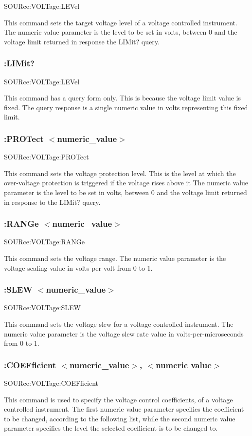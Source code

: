 {\ttfamily S\-O\-U\-Rce\-:\-V\-O\-L\-Tage\-:L\-E\-Vel}\par
 This command sets the target voltage level of a voltage controlled instrument. The numeric value parameter is the level to be set in volts, between 0 and the voltage limit returned in response the L\-I\-Mit? query.\hypertarget{a00002_sourvoltlim}{}\subsubsection{\-:\-L\-I\-Mit?}\label{a00002_sourvoltlim}
{\ttfamily S\-O\-U\-Rce\-:\-V\-O\-L\-Tage\-:L\-E\-Vel}\par
 This command has a query form only. This is because the voltage limit value is fixed. The query response is a single numeric value in volts representing this fixed limit.\hypertarget{a00002_sourvoltprot}{}\subsubsection{\-:\-P\-R\-O\-Tect $<$numeric\-\_\-value$>$}\label{a00002_sourvoltprot}
{\ttfamily S\-O\-U\-Rce\-:\-V\-O\-L\-Tage\-:P\-R\-O\-Tect}\par
 This command sets the voltage protection level. This is the level at which the over-\/voltage protection is triggered if the voltage rises above it The numeric value parameter is the level to be set in volts, between 0 and the voltage limit returned in response to the L\-I\-Mit? query.\hypertarget{a00002_sourvoltrang}{}\subsubsection{\-:\-R\-A\-N\-Ge $<$numeric\-\_\-value$>$}\label{a00002_sourvoltrang}
{\ttfamily S\-O\-U\-Rce\-:\-V\-O\-L\-Tage\-:R\-A\-N\-Ge}\par
 This command sets the voltage range. The numeric value parameter is the voltage scaling value in volts-\/per-\/volt from 0 to 1.\hypertarget{a00002_sourvoltslew}{}\subsubsection{\-:\-S\-L\-E\-W $<$numeric\-\_\-value$>$}\label{a00002_sourvoltslew}
{\ttfamily S\-O\-U\-Rce\-:\-V\-O\-L\-Tage\-:S\-L\-E\-W}\par
 This command sets the voltage slew for a voltage controlled instrument. The numeric value parameter is the voltage slew rate value in volts-\/per-\/microseconds from 0 to 1.\hypertarget{a00002_sourvoltcoef}{}\subsubsection{\-:\-C\-O\-E\-Fficient $<$numeric\-\_\-value$>$, $<$numeric value$>$}\label{a00002_sourvoltcoef}
{\ttfamily S\-O\-U\-Rce\-:\-V\-O\-L\-Tage\-:C\-O\-E\-Fficient}\par
 This command is used to specify the voltage control coefficients, of a voltage controlled instrument. The first numeric value parameter specifies the coefficient to be changed, according to the following list, while the second numeric value parameter specifies the level the selected coefficient is to be changed to.

